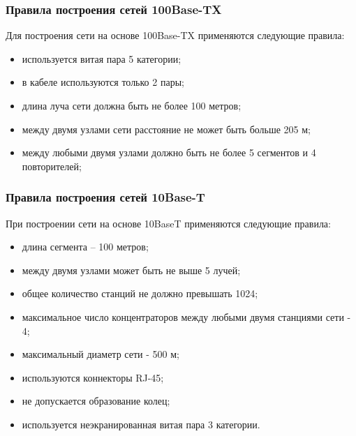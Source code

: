 \documentclass[russian,utf8,emptystyle]{eskdtext}
\begin{document}
\subsubsection{Правила построения сетей 100Base-TX}
Для построения сети на основе 100Base-TX применяются следующие правила:
\begin{itemize}[label=-]
\item используется витая пара 5 категории;
\item в кабеле используются только 2 пары;
\item длина луча сети должна быть не более 100 метров;
\item между двумя узлами сети расстояние не может быть больше 205 м;
\item между любыми двумя узлами должно быть не более 5 сегментов и 4 повторителей;
\end{itemize}

\subsubsection{Правила построения сетей 10Base-T}
При построении сети на основе 10BaseT применяются следующие правила:
\begin{itemize}[label=-]
\item длина сегмента – 100 метров;
\item между двумя узлами может быть не выше 5 лучей;
\item общее количество станций не должно превышать 1024;
\item максимальное число концентраторов между любыми двумя станциями сети - 4;
\item максимальный диаметр сети - 500 м;
\item используются коннекторы RJ-45;
\item не допускается образование колец;
\item используется неэкранированная витая пара 3 категории.
\end{itemize}
\end{document}
